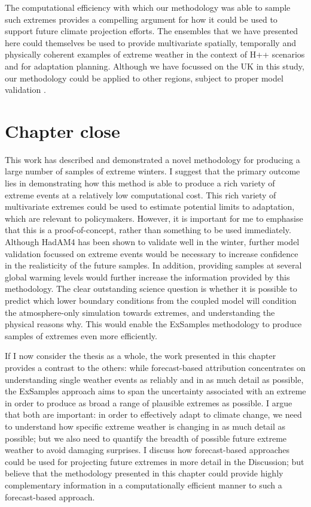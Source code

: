   The computational efficiency with which our methodology was able to sample such extremes provides a compelling argument for how it could be used to support future climate projection efforts. The ensembles that we have presented here could themselves be used to provide  multivariate spatially, temporally and physically coherent examples of extreme weather in the context of H++ scenarios and for adaptation planning. Although we have focussed on the UK in this study, our methodology could be applied to other regions, subject to proper model validation \citep{murphy_ukcp18_2018,watson_multi-thousand_2020}.
  
\section{Chapter close}\label{ch5:close}

  This work has described and demonstrated a novel methodology for producing a large number of samples of extreme winters. I suggest that the primary outcome lies in demonstrating how this method is able to produce a rich variety of extreme events at a relatively low computational cost. This rich variety of multivariate extremes could be used to estimate potential limits to adaptation, which are relevant to policymakers. However, it is important for me to emphasise that this is a proof-of-concept, rather than something to be used immediately. Although HadAM4 has been shown to validate well in the winter, further model validation focussed on extreme events would be necessary to increase confidence in the realisticity of the future samples. In addition, providing samples at several global warming levels would further increase the information provided by this methodology. The clear outstanding science question is whether it is possible to predict which lower boundary conditions from the coupled model will condition the atmosphere-only simulation towards extremes, and understanding the physical reasons why. This would enable the ExSamples methodology to produce samples of extremes even more efficiently.

  If I now consider the thesis as a whole, the work presented in this chapter provides a contrast to the others: while forecast-based attribution concentrates on understanding single weather events as reliably and in as much detail as possible, the ExSamples approach aims to span the uncertainty associated with an extreme in order to produce as broad a range of plausible extremes as possible. I argue that both are important: in order to effectively adapt to climate change, we need to understand how specific extreme weather is changing in as much detail as possible; but we also need to quantify the breadth of possible future extreme weather to avoid damaging surprises. I discuss how forecast-based approaches could be used for projecting future extremes in more detail in the Discussion; but believe that the methodology presented in this chapter could provide highly complementary information in a computationally efficient manner to such a forecast-based approach.